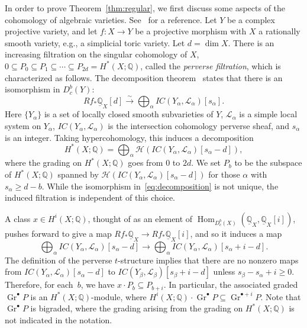 In order to prove Theorem~\ref{thm:regular}, we first discuss some aspects of the cohomology of algebraic varieties. See~\cite{dCM} for a reference. 
Let $Y$ be a complex projective variety, and let $f \colon X \to Y$ be a projective morphism with $X$ a rationally smooth variety, e.g., a simplicial toric variety. Let $d = \dim X$. There is an increasing filtration on the singular cohomology of $X$, $0 \subseteq P_0 \subseteq P_1 \subseteq \dotsb \subseteq P_{2d} = H^*(X; \mathbb{Q})$, called the \emph{perverse filtration}, which is characterized as follows. The decomposition theorem~\cite{BBDG} states that there is an isomorphism in $D^b_c(Y)$:
\begin{equation}\label{eq:decomposition}
Rf_* \underline{\mathbb{Q}}_X[d] \stackrel{\sim}{\to} \bigoplus_{\alpha} IC(Y_{\alpha}, \mathcal{L}_{\alpha})[s_{\alpha}].
\end{equation}
Here $\{Y_{\alpha}\}$ is a set of locally closed smooth subvarieties of $Y$, $\mathcal{L}_{\alpha}$ is a simple local system on $Y_{\alpha}$, $IC(Y_{\alpha}, \mathcal{L}_{\alpha})$ is the intersection cohomology perverse sheaf, and $s_{\alpha}$ is an integer. Taking hypercohomology, this induces a decomposition
$$H^*(X; \mathbb{Q}) = \bigoplus_{\alpha} \mathcal{H}(IC(Y_{\alpha}, \mathcal{L}_{\alpha})[s_{\alpha} - d]),$$
where the grading on $H^*(X; \mathbb{Q})$ goes from $0$ to $2d$. 
We set $P_b$ to be the subspace of $H^*(X; \mathbb{Q})$ spanned by $\mathcal{H}(IC(Y_{\alpha}, \mathcal{L}_{\alpha})[s_{\alpha} - d])$ for those $\alpha$ with $s_{\alpha} \ge d - b$.  While the isomorphism in~\eqref{eq:decomposition} is not unique, the induced filtration is independent of this choice. 

A class $x \in H^i(X; \mathbb{Q})$, thought of as an element of $\operatorname{Hom}_{D^b_c(X)}(\underline{\mathbb{Q}}_X, \underline{\mathbb{Q}}_X[i])$, pushes forward to give a map $Rf_* \underline{\mathbb{Q}}_X \to Rf_* \underline{\mathbb{Q}}_X[i]$, and so it induces a map
$$\bigoplus_{\alpha} IC(Y_{\alpha}, \mathcal{L}_{\alpha})[s_{\alpha} - d] \to \bigoplus_{\alpha} IC(Y_{\alpha}, \mathcal{L}_{\alpha})[s_{\alpha} + i - d].$$
The definition of the perverse $t$-structure implies that there are no nonzero maps from $IC(Y_{\alpha}, \mathcal{L}_{\alpha})[s_{\alpha} - d]$ to $IC(Y_{\beta}, \mathcal{L}_{\beta})[s_{\beta} + i - d]$ unless $s_{\beta} - s_{\alpha} + i \ge 0$. Therefore, for each~$b$, we have $x \cdot P_b \subseteq P_{b + i}$. In particular, the associated graded $\operatorname{Gr}^{\bullet} P$ is an $H^*(X; \mathbb{Q})$-module, where $H^i(X; \mathbb{Q}) \cdot \operatorname{Gr}^{\bullet} P \subseteq \operatorname{Gr}^{\bullet + i} P$. Note that $\operatorname{Gr}^{\bullet} P$ is bigraded, where the grading arising from the grading on $H^*(X; \mathbb{Q})$ is not indicated in the notation. 

